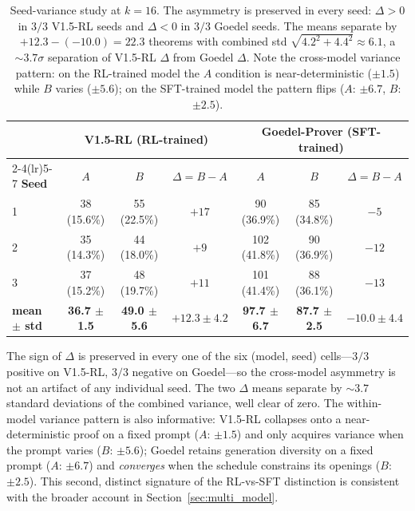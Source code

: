 \documentclass{article}
\begin{document}
\begin{table}[t]
\centering
\small
\begin{tabular}{lcccccc}
\toprule
& \multicolumn{3}{c}{\textbf{V1.5-RL (RL-trained)}} & \multicolumn{3}{c}{\textbf{Goedel-Prover (SFT-trained)}} \\
\cmidrule(lr){2-4}\cmidrule(lr){5-7}
\textbf{Seed} & $A$ & $B$ & $\Delta = B-A$ & $A$ & $B$ & $\Delta = B-A$ \\
\midrule
1 & 38 (15.6\%) & 55 (22.5\%) & $+17$ & 90 (36.9\%) & 85 (34.8\%) & $-5$  \\
2 & 35 (14.3\%) & 44 (18.0\%) & $+9$  & 102 (41.8\%) & 90 (36.9\%) & $-12$ \\
3 & 37 (15.2\%) & 48 (19.7\%) & $+11$ & 101 (41.4\%) & 88 (36.1\%) & $-13$ \\
\midrule
\textbf{mean $\pm$ std} & \textbf{36.7 $\pm$ 1.5} & \textbf{49.0 $\pm$ 5.6} & \textbf{$+12.3 \pm 4.2$} & \textbf{97.7 $\pm$ 6.7} & \textbf{87.7 $\pm$ 2.5} & \textbf{$-10.0 \pm 4.4$} \\
\bottomrule
\end{tabular}
\caption{Seed-variance study at $k{=}16$. The asymmetry is preserved in every seed: $\Delta > 0$ in $3/3$ V1.5-RL seeds and $\Delta < 0$ in $3/3$ Goedel seeds. The means separate by $+12.3-(-10.0)=22.3$ theorems with combined std $\sqrt{4.2^2+4.4^2}\approx 6.1$, a $\sim 3.7\sigma$ separation of V1.5-RL $\Delta$ from Goedel $\Delta$. Note the cross-model variance pattern: on the RL-trained model the $A$ condition is near-deterministic ($\pm 1.5$) while $B$ varies ($\pm 5.6$); on the SFT-trained model the pattern flips ($A$: $\pm 6.7$, $B$: $\pm 2.5$).}
\label{tab:seeds}
\end{table}

The sign of $\Delta$ is preserved in every one of the six (model, seed) cells---$3/3$ positive on V1.5-RL, $3/3$ negative on Goedel---so the cross-model asymmetry is not an artifact of any individual seed. The two $\Delta$ means separate by $\sim 3.7$ standard deviations of the combined variance, well clear of zero. The within-model variance pattern is also informative: V1.5-RL collapses onto a near-deterministic proof on a fixed prompt ($A$: $\pm 1.5$) and only acquires variance when the prompt varies ($B$: $\pm 5.6$); Goedel retains generation diversity on a fixed prompt ($A$: $\pm 6.7$) and \emph{converges} when the schedule constrains its openings ($B$: $\pm 2.5$). This second, distinct signature of the RL-vs-SFT distinction is consistent with the broader account in Section~\ref{sec:multi_model}.
\end{document}

